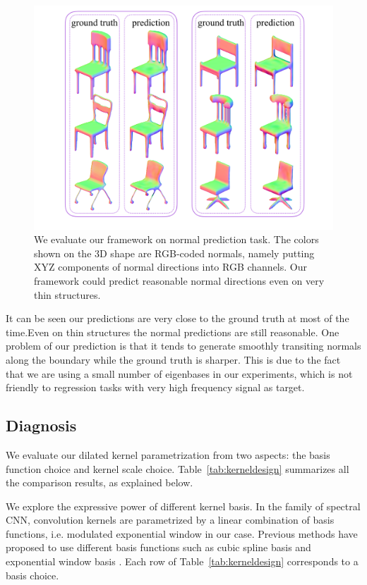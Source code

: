 \begin{figure}
 \centering
 \includegraphics[width=1\linewidth]{./fig/visnormal.pdf}
 \caption{We evaluate our framework on normal prediction task. The colors shown on the 3D shape are RGB-coded normals, namely putting XYZ components of normal directions into RGB channels. Our framework could predict reasonable normal directions even on very thin structures.}
 \label{fig:normpred}
\end{figure}

It can be seen our predictions are very close to the ground truth at most of the time.Even on thin structures the normal predictions are still reasonable. One problem of our prediction is that it tends to generate smoothly transiting normals along the boundary while the ground truth is sharper. This is due to the fact that we are using a small number of eigenbases in our experiments, which is not friendly to regression tasks with very high frequency signal as target.

\subsection{Diagnosis}
 We evaluate our dilated kernel parametrization from two aspects: the basis function choice and kernel scale choice. Table~\ref{tab:kerneldesign} summarizes all the comparison results, as explained below.
 
We explore the expressive power of different kernel basis. In the family of spectral CNN, convolution kernels are parametrized by a linear combination of basis functions, i.e. modulated exponential window in our case. Previous methods have proposed to use different basis functions such as cubic spline basis \cite{bruna2013spectral} and exponential window basis \cite{boscaini2016learning}. Each row of Table~\ref{tab:kerneldesign} corresponds to a basis choice.
 
